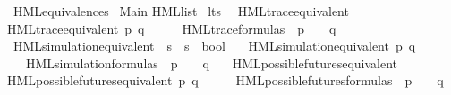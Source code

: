 %
\begin{isabellebody}%
%
%
\isadelimtheory
%
\endisadelimtheory
%
\isatagtheory
{}\isamarkupfalse%
\ HML{\isacharunderscore}{\kern0pt}equivalences\isanewline
{}\ Main\isanewline
HML{\isacharunderscore}{\kern0pt}list\isanewline
{}%
\endisatagtheory
{\isafoldtheory}%
%
\isadelimtheory
\isanewline
%
\endisadelimtheory
\isanewline
{}\isamarkupfalse%
\ lts\ \isanewline
\isanewline
{}\isamarkupfalse%
\ HML{\isacharunderscore}{\kern0pt}trace{\isacharunderscore}{\kern0pt}equivalent\ \isanewline
{\isachardoublequoteopen}HML{\isacharunderscore}{\kern0pt}trace{\isacharunderscore}{\kern0pt}equivalent\ p\ q\ {\isasymequiv}\ {\isacharparenleft}{\kern0pt}{\isasymforall}\ {\isasymphi}{\isachardot}{\kern0pt}\ {\isasymphi}\ {\isasymin}\ HML{\isacharunderscore}{\kern0pt}trace{\isacharunderscore}{\kern0pt}formulas\ {\isasymlongrightarrow}\ {\isacharparenleft}{\kern0pt}p\ {\isasymTurnstile}\ {\isasymphi}{\isacharparenright}{\kern0pt}\ {\isasymlongleftrightarrow}\ {\isacharparenleft}{\kern0pt}q\ {\isasymTurnstile}\ {\isasymphi}{\isacharparenright}{\kern0pt}{\isacharparenright}{\kern0pt}{\isachardoublequoteclose}\isanewline
\isanewline
{}\isamarkupfalse%
\ HML{\isacharunderscore}{\kern0pt}simulation{\isacharunderscore}{\kern0pt}equivalent\ {\isacharcolon}{\kern0pt}{\isacharcolon}{\kern0pt}\ {\isacartoucheopen}{\isacharprime}{\kern0pt}s\ {\isasymRightarrow}\ {\isacharprime}{\kern0pt}s\ {\isasymRightarrow}\ bool{\isacartoucheclose}\ \isanewline
\ \ {\isachardoublequoteopen}HML{\isacharunderscore}{\kern0pt}simulation{\isacharunderscore}{\kern0pt}equivalent\ p\ q\ {\isasymequiv}\ \isanewline
{\isacharparenleft}{\kern0pt}{\isasymforall}{\isasymphi}{\isachardot}{\kern0pt}\ {\isasymphi}\ {\isasymin}\ HML{\isacharunderscore}{\kern0pt}simulation{\isacharunderscore}{\kern0pt}formulas\ {\isasymlongrightarrow}\ {\isacharparenleft}{\kern0pt}p\ {\isasymTurnstile}\ {\isasymphi}\ {\isasymlongleftrightarrow}\ q\ {\isasymTurnstile}\ {\isasymphi}{\isacharparenright}{\kern0pt}{\isacharparenright}{\kern0pt}{\isachardoublequoteclose}\isanewline
\isanewline
{}\isamarkupfalse%
\ HML{\isacharunderscore}{\kern0pt}possible{\isacharunderscore}{\kern0pt}futures{\isacharunderscore}{\kern0pt}equivalent\ \isanewline
{\isachardoublequoteopen}HML{\isacharunderscore}{\kern0pt}possible{\isacharunderscore}{\kern0pt}futures{\isacharunderscore}{\kern0pt}equivalent\ p\ q\ {\isasymequiv}\ {\isacharparenleft}{\kern0pt}{\isasymforall}\ {\isasymphi}{\isachardot}{\kern0pt}\ {\isasymphi}\ {\isasymin}\ HML{\isacharunderscore}{\kern0pt}possible{\isacharunderscore}{\kern0pt}futures{\isacharunderscore}{\kern0pt}formulas\ {\isasymlongrightarrow}\ {\isacharparenleft}{\kern0pt}p\ {\isasymTurnstile}\ {\isasymphi}{\isacharparenright}{\kern0pt}\ {\isasymlongleftrightarrow}\ {\isacharparenleft}{\kern0pt}q\ {\isasymTurnstile}\ {\isasymphi}{\isacharparenright}{\kern0pt}{\isacharparenright}{\kern0pt}{\isachardoublequoteclose}\isanewline

\end{isabellebody}
